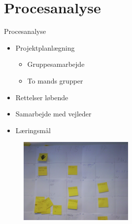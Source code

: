 \section{Procesanalyse}
\begin{frame}{Procesanalyse}
\begin{itemize}
	\item Projektplanl\ae{}gning
	\begin{itemize}
		\item Gruppesamarbejde
		\item To mands grupper
	\end{itemize}
	\item Rettelser l\o{}bende
	\item Samarbejde med vejleder
	\item L\ae{}ringsm\aa{}l
\end{itemize}
\begin{figure}
	\centering
		\includegraphics[width=0.5\textwidth]{input/pics/Billede0075.jpg}
	\label{fig:Billede0075}
\end{figure}
\end{frame}